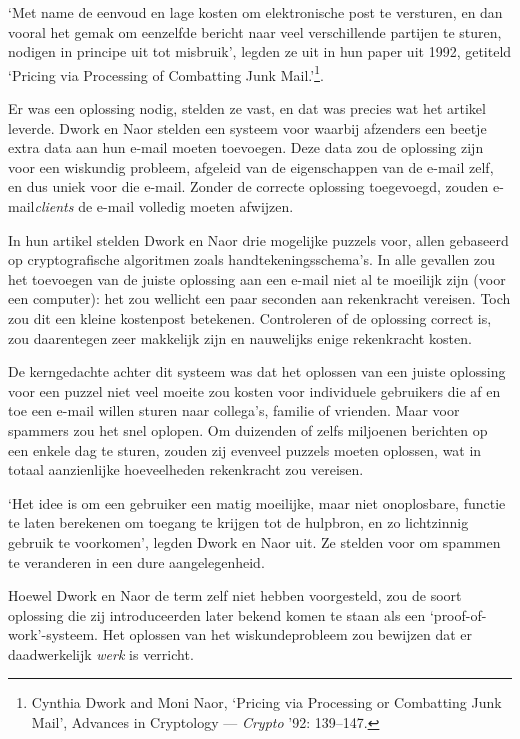 \documentclass[
  a5paper,
  smalldemyvopaper,11pt,twoside,onecolumn,openright,extrafontsizes]{memoir}
\begin{document}
`Met name de eenvoud en lage kosten om elektronische post te versturen,
en dan vooral het gemak om eenzelfde bericht naar veel verschillende
partijen te sturen, nodigen in principe uit tot misbruik', legden ze uit
in hun paper uit 1992, getiteld `Pricing via Processing of Combatting
Junk Mail.'\footnote{Cynthia Dwork and Moni Naor, `Pricing via
  Processing or Combatting Junk Mail', Advances in Cryptology ---
  \emph{Crypto} '92: 139--147.}.

Er was een oplossing nodig, stelden ze vast, en dat was precies wat het
artikel leverde. Dwork en Naor stelden een systeem voor waarbij
afzenders een beetje extra data aan hun e-mail moeten toevoegen. Deze
data zou de oplossing zijn voor een wiskundig probleem, afgeleid van de
eigenschappen van de e-mail zelf, en dus uniek voor die e-mail. Zonder
de correcte oplossing toegevoegd, zouden e-mail\emph{clients} de e-mail
volledig moeten afwijzen.

In hun artikel stelden Dwork en Naor drie mogelijke puzzels voor, allen
gebaseerd op cryptografische algoritmen zoals handtekeningsschema's. In
alle gevallen zou het toevoegen van de juiste oplossing aan een e-mail
niet al te moeilijk zijn (voor een computer): het zou wellicht een paar
seconden aan rekenkracht vereisen. Toch zou dit een kleine kostenpost
betekenen. Controleren of de oplossing correct is, zou daarentegen zeer
makkelijk zijn en nauwelijks enige rekenkracht kosten.

De kerngedachte achter dit systeem was dat het oplossen van een juiste
oplossing voor een puzzel niet veel moeite zou kosten voor individuele
gebruikers die af en toe een e-mail willen sturen naar collega's,
familie of vrienden. Maar voor spammers zou het snel oplopen. Om
duizenden of zelfs miljoenen berichten op een enkele dag te sturen,
zouden zij evenveel puzzels moeten oplossen, wat in totaal aanzienlijke
hoeveelheden rekenkracht zou vereisen.

`Het idee is om een gebruiker een matig moeilijke, maar niet
onoplosbare, functie te laten berekenen om toegang te krijgen tot de
hulpbron, en zo lichtzinnig gebruik te voorkomen', legden Dwork en Naor
uit. Ze stelden voor om spammen te veranderen in een dure
aangelegenheid.

Hoewel Dwork en Naor de term zelf niet hebben voorgesteld, zou de soort
oplossing die zij introduceerden later bekend komen te staan als een
`proof-of-work'-systeem. Het oplossen van het wiskundeprobleem zou
bewijzen dat er daadwerkelijk \emph{werk} is verricht.
\end{document}
